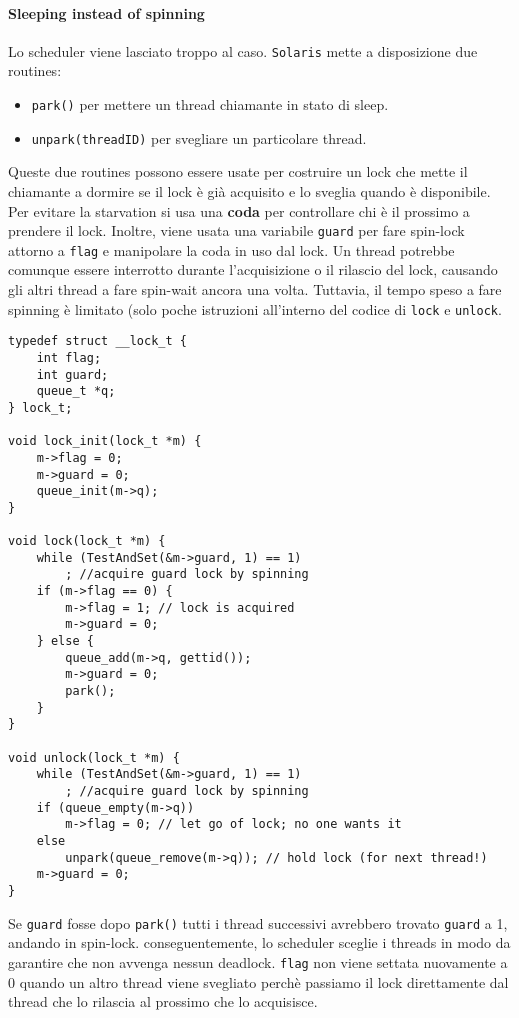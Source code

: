 \documentclass[12pt, letterpaper]{article}
\begin{document}
				\paragraph{Sleeping instead of spinning} Lo scheduler viene lasciato troppo al caso. \texttt{Solaris} mette a disposizione due routines:
				\begin{itemize}
					\item \texttt{park()} per mettere un thread chiamante in stato di sleep.
					\item \texttt{unpark(threadID)} per svegliare un particolare thread.
				\end{itemize}
				Queste due routines possono essere usate per costruire un lock che mette il chiamante a dormire se il lock è già acquisito e lo sveglia quando è disponibile. Per evitare la starvation si usa una \textbf{coda} per controllare chi è il prossimo a prendere il lock. Inoltre, viene usata una variabile \texttt{guard} per fare spin-lock attorno a \texttt{flag} e manipolare la coda in uso dal lock. Un thread potrebbe comunque essere interrotto durante l'acquisizione o il rilascio del lock, causando gli altri thread a fare spin-wait ancora una volta. Tuttavia, il tempo speso a fare spinning è limitato (solo poche istruzioni all'interno del codice di \texttt{lock} e \texttt{unlock}.
				
				\begin{lstlisting}[style=CStyle]
typedef struct __lock_t {
	int flag;
	int guard;
	queue_t *q;
} lock_t;

void lock_init(lock_t *m) {
	m->flag = 0;
	m->guard = 0;
	queue_init(m->q);
}

void lock(lock_t *m) {
	while (TestAndSet(&m->guard, 1) == 1)
		; //acquire guard lock by spinning
	if (m->flag == 0) {
		m->flag = 1; // lock is acquired
		m->guard = 0;
	} else {
		queue_add(m->q, gettid());
		m->guard = 0;
		park();
	}
}

void unlock(lock_t *m) {
	while (TestAndSet(&m->guard, 1) == 1)
		; //acquire guard lock by spinning
	if (queue_empty(m->q))
		m->flag = 0; // let go of lock; no one wants it
	else
		unpark(queue_remove(m->q)); // hold lock (for next thread!)
	m->guard = 0;
}				\end{lstlisting}				
				
				Se \texttt{guard} fosse dopo \texttt{park()} tutti i thread successivi avrebbero trovato \texttt{guard} a 1, andando in spin-lock.
				conseguentemente, lo scheduler sceglie i threads in modo da garantire che non avvenga nessun
deadlock.
				\texttt{flag} non viene settata nuovamente a 0 quando un altro thread viene svegliato perchè passiamo il lock direttamente dal thread che lo rilascia al prossimo che lo acquisisce. 
				
\end{document}
